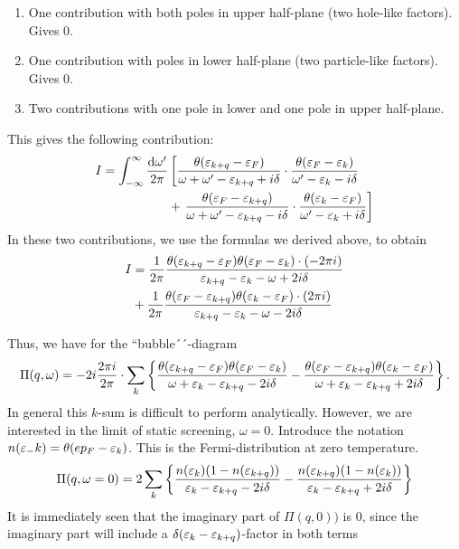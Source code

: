 \begin{enumerate}
	\item One contribution with both poles in upper half-plane (two hole-like factors). Gives 0.
	\item One contribution with poles in lower half-plane (two particle-like factors). Gives 0.
	\item Two contributions with one pole in lower and one pole in upper half-plane.
\end{enumerate}
This gives the following contribution:
\begin{align*}
	I = \int_{-\infty}^{\infty}\frac{\dd{\omega'}}{2\pi}&\left[\frac{\theta(\varepsilon_{k+q}-\varepsilon_F)}{\omega+\omega'-\varepsilon_{k+q}+i\delta}\cdot\frac{\theta(\varepsilon_F-\varepsilon_k)}{\omega'-\varepsilon_k-i\delta}\right. \\ &+
	\left.\frac{\theta(\varepsilon_F-\varepsilon_{k+q})}{\omega+\omega'-\varepsilon_{k+q}-i\delta}\cdot\frac{\theta(\varepsilon_k-\varepsilon_F)}{\omega'-\varepsilon_k+i\delta}\right]
\end{align*}
In these two contributions, we use the formulas we derived above, to obtain
\begin{align}
	\begin{split}
	I &= \frac{1}{2\pi}\frac{\theta(\varepsilon_{k+q}-\varepsilon_{F})\theta(\varepsilon_F-\varepsilon_k)\cdot(-2\pi i)}{\varepsilon_{k+q}-\varepsilon_k - \omega +2i\delta} \\
	&+ \frac{1}{2\pi}\frac{\theta(\varepsilon_F-\varepsilon_{k+q})\theta(\varepsilon_k-\varepsilon_F)\cdot(2\pi i)}{\varepsilon_{k+q}-\varepsilon_k - \omega -2i\delta}
	\end{split}
\end{align}

Thus, we have for the ``bubble´´-diagram 
\begin{equation}\label{eq:bubble}
\Pi(q, \omega) = -2i\frac{2\pi i}{2\pi}\cdot \sum_k \left\{
 \frac{\theta(\varepsilon_{k+q}-\varepsilon_{F})\theta(\varepsilon_F-\varepsilon_k)}{\omega +\varepsilon_k -\varepsilon_{k+q}  -2i\delta} -
 \frac{\theta(\varepsilon_F-\varepsilon_{k+q})\theta(\varepsilon_k-\varepsilon_F) }{\omega +\varepsilon_k - \varepsilon_{k+q} +2i\delta}
\right\}.
\end{equation}
In general this $k$-sum is difficult to perform analytically. However, we are interested in the limit of static screening, $\omega = 0$. Introduce the notation \(n(\varepsilon_-k) = \theta(ep_F-\varepsilon_k)\). This is the Fermi-distribution at zero temperature. 
\begin{equation}\label{key}
\Pi(q, \omega=0) = 2\sum_k\left\{\frac{n(\varepsilon_k)(1-n(\varepsilon_{k+q}))}{\varepsilon_k-\varepsilon_{k+q} - 2i\delta} - \frac{n(\varepsilon_{k+q})(1-n(\varepsilon_{k}))}{\varepsilon_k-\varepsilon_{k+q} + 2i\delta}\right\}
\end{equation}
It is immediately seen that the imaginary part of $\Pi(q, 0))$ is 0, since the imaginary part will include a $\delta(\varepsilon_k - \varepsilon_{k+q})$-factor in both terms


